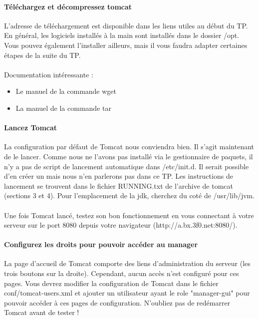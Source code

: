 \documentclass[12pt,a4paper]{article}
\begin{document}
\begin{itemize}
\paragraph{Téléchargez et décompressez tomcat\\}
L'adresse de téléchargement est disponible dans les liens utiles au début du TP. En général, les logiciels installés à la main sont installés dans le dossier /opt. Vous pouvez également l'installer ailleurs, mais il vous faudra adapter certaines étapes de la suite du TP.

\paragraph{}
Documentation intéressante : 
\begin{itemize}
\item Le manuel de la commande wget
\item La manuel de la commande tar
\end{itemize}

\paragraph{Lancez Tomcat\\}
La configuration par défaut de Tomcat nous conviendra bien. Il s'agit maintenant de le lancer. Comme nous ne l'avons pas installé via le gestionnaire de paquets, il n'y a pas de script de lancement automatique dans /etc/init.d. Il serait possible d'en créer un mais nous n'en parlerons pas dans ce TP. Les instructions de lancement se trouvent dans le fichier RUNNING.txt de l'archive de tomcat (sections 3 et 4). Pour l'emplacement de la jdk, cherchez du coté de /usr/lib/jvm.

\paragraph{}
Une fois Tomcat lancé, testez son bon fonctionnement en vous connectant à votre serveur sur le port 8080 depuis votre navigateur (http://a.bx.3f0.net:8080/).

\paragraph{Configurez les droits pour pouvoir accéder au manager\\}
La page d'accueil de Tomcat comporte des liens d'administration du serveur (les trois boutons sur la droite). Cependant, aucun accès n'est configuré pour ces pages. Vous devrez modifier la configuration de Tomcat dans le fichier conf/tomcat-users.xml et ajouter un utilisateur ayant le role "manager-gui" pour pouvoir accéder à ces pages de configuration. N'oubliez pas de redémarrer Tomcat avant de tester !


\end{itemize}
\end{document}
